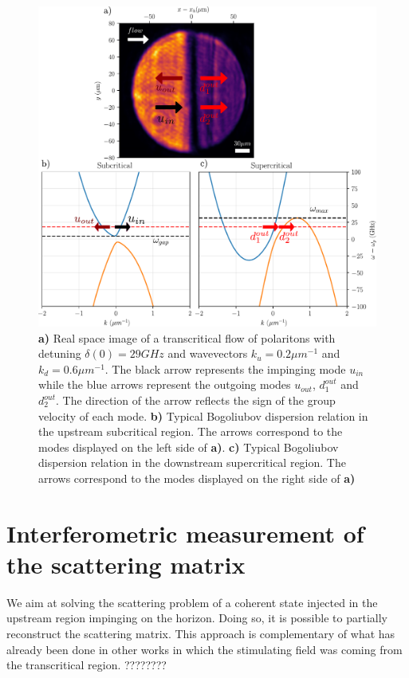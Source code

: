 \begin{figure}[htbp]
    \centering
    \includegraphics[width=1\textwidth]{chap_stimulated_hawking/fig/typical_dens_2D.pdf}
    \caption{\textbf{a)} Real space image of a transcritical flow of polaritons with detuning $\delta(0)=29 GHz$ and wavevectors $k_u=0.2 \mu m^{-1}$ and $k_d=0.6\mu m^{-1}$. The black arrow represents the impinging mode $u_{in}$ while the blue arrows represent the outgoing modes $u_{out}$, $d_1^{out}$ and $d_2^{out}$. The direction
    of the arrow reflects the sign of the group velocity of each mode.
    \textbf{b)} Typical Bogoliubov dispersion relation in the upstream subcritical region. The arrows correspond to the modes displayed on the left side of \textbf{a)}. 
    \textbf{c)} Typical Bogoliubov dispersion relation in the downstream supercritical region. The arrows correspond to the modes displayed on the right side of \textbf{a)}}
    \label{fig:typical_dens_2D}
\end{figure}


\section{Interferometric measurement of the scattering matrix }
\label{sec:principle_measurement}

We aim at solving the scattering problem of a coherent state injected in the upstream region impinging on the horizon. Doing so, it is possible
to partially reconstruct the scattering matrix. This approach is complementary of what has already been done in other works in which 
the stimulating field was coming from the transcritical region. ???????? 

